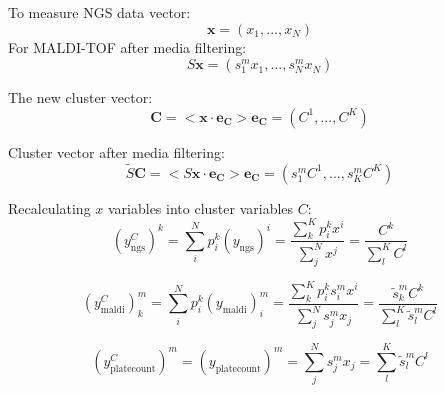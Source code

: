 \documentclass[10pt,A4paper]{article}
\begin{document}

To measure NGS data vector:
\begin{equation}
    \mathbf{x} = (x_1, ..., x_N)
\end{equation}
For MALDI-TOF after media filtering:
\begin{equation}
    S\mathbf{x} = (s^m_1 x_1, ..., s^m_N x_N)
\end{equation}

The new cluster vector:
\begin{equation}
    \mathbf{C} = <\mathbf{x} \cdot \mathbf{e_C}> \mathbf{e_C} = (C^1, ..., C^K)
\end{equation}

Cluster vector after media filtering:
\begin{equation}
   \tilde{S} \mathbf{C} = <S \mathbf{x} \cdot \mathbf{e_C}> \mathbf{e_C} = (s^m_1 C^1, ..., s^m_K C^K)
\end{equation}

Recalculating $x$ variables into cluster variables $C$:
\begin{equation}
    (y^C_\text{ngs})^k = \sum_i^N p_i^k (y_\text{ngs})^i = \frac{\sum_k^K p_i^k x^i}{\sum_j^N x^j} = \frac{C^k}{\sum_l^K C^l}
\end{equation}

\begin{equation}
    (y^C_\text{maldi})_k^m = \sum_i^N p_i^k (y_\text{maldi})_i^m = \frac{\sum_k^K p_i^k s^m_i x^i}{\sum_j^N s^m_j x_j} = \frac{\tilde s^m_k C^k}{\sum_l^K  \tilde s^m_l C^l}
\end{equation}

\begin{equation}
    (y^C_\text{platecount})^m = (y_\text{platecount})^m = \sum_j^N s^m_j x_j = \sum_l^K  \tilde s^m_l C^l
\end{equation}
\end{document}
